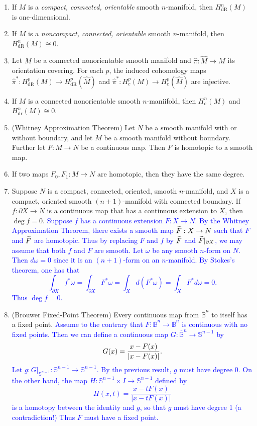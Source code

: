 \documentclass{article}
\newcommand{\expl}[1]{\textcolor{blue}{#1}}
\begin{document}
\begin{enumerate}
		\item If $M$ is a \textit{compact, connected, orientable} smooth $n$-manifold, then $H^{n}_{\text{dR}}(M)$ is one-dimensional. 
		\item If $M$ is a \textit{noncompact, connected, orientable} smooth $n$-manifold, then $H^{n}_{\text{dR}}(M) \cong 0$. 
		\item Let $M$ be a connected nonorientable smooth manifold and $\hat{\pi}: \hat{M} \to M$ its orientation covering. For each $p$, the induced cohomology maps $\hat{\pi}^{\ast}: H^{p}_{\text{dR}}(M) \to H^{p}_{\text{dR}}(\hat{M})$ and $\hat{\pi}^{\ast}: H^{p}_{c}(M) \to H^{p}_{c}(\hat{M})$ are injective. 
		\item If $M$ is a connected nonorientable smooth $n$-maniifold, then $H^{n}_{c}(M)$ and $H^{n}_{\text{dr}}(M) \cong 0$. 
		\item (Whitney Approximation Theorem) Let $N$ be a smooth manifold with or without boundary, and let $M$ be a smooth manifold without boundary. Further let $F: M \to N$ be a continuous map. Then $F$ is homotopic to a smooth map. 
		\item If two maps $F_{0}, F_{1}: M \to N$ are homotopic, then they have the same degree. 
		\item Suppose $N$ is a compact, connected, oriented, smooth $n$-manifold, and $X$ is a compact, oriented smooth $(n + 1)$-manifold with connected boundary. If $f: \partial X \to N$ is a continuous map that has a continuous extension to $X$, then $\deg{f} = 0$. \newline \expl{Suppose $f$ has a continuous extension $F: X\to N$. By the Whitney Approximation Theorem, there exists a smooth map $\widetilde{F}: X \to N$ such that $F$ and $\widetilde{F}$ are homotopic. Thus by replacing $F$ and $f$ by $\widetilde{F}$ and $\widetilde{F}|_{\partial X}$, we may assume that both $f$ and $F$ are smooth. Let $\omega$ be any smooth $n$-form on $N$. Then $d\omega = 0$ since it is an $(n + 1)$-form on an $n$-manifold. By Stokes's theorem, one has that $$\int_{\partial X}f^{\ast}\omega = \int_{\partial X}F^{\ast}\omega = \int_{X}d(F^{\ast}\omega) = \int_{X}F^{\ast}d\omega = 0.$$ Thus $\deg{f} = 0.$}
		\item (Brouwer Fixed-Point Theorem) Every continuous map from $\overline{\mathbb{B}}^{n}$ to itself has a fixed point. \newline \expl{Assume to the contrary that $F: \overline{\mathbb{B}}^{n} \to \overline{\mathbb{B}}^{n}$ is continuous with no fixed points. Then we can define a continuous map $G: \overline{\mathbb{B}}^{n} \to \mathbb{S}^{n -1}$ by $$G(x) = \frac{x - F(x)}{\left| x - F(x) \right|}.$$ Let $g: G|_{\mathbb{S}^{n-1}}: \mathbb{S}^{n-1} \to \mathbb{S}^{n-1}$. By the previous result, $g$ must have degree 0. On the other hand, the map $H: \mathbb{S}^{n-1} \times I \to \mathbb{S}^{n-1}$ defined by $$H(x, t) = \frac{x - tF(x)}{|x - tF(x)|}$$ is a homotopy between the identity and $g$, so that $g$ must have degree 1 (a contradiction!) Thus $F$ must have a fixed point.}

\end{enumerate}
\end{document}
